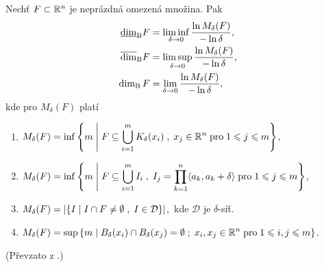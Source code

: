 \begin{theorem}\label{thm:ekvivalentni-def-box-counting-dimenze}
    Nechť $F\subset \mathbb{R}^n$ je neprázdná omezená množina. Pak
    \begin{align*}
        \underline{\dim}_\text{B}{F}&=\liminf_{\delta\to 0}\dfrac{\ln{M_\delta(F)}}{-\ln{\delta}},\\
        \overline{\dim}_\text{B}{F}&=\limsup_{\delta\to 0}\dfrac{\ln{M_\delta(F)}}{-\ln{\delta}},\\
        \operatorname{dim_B}{F}&=\lim_{\delta\to 0}\dfrac{\ln{M_\delta(F)}}{-\ln{\delta}},
    \end{align*}
    kde pro $M_\delta(F)$ platí
    \begin{enumerate}[label=(\roman*)]
        \item\label{thm:pokryti-delta-uz-koulemi} $\displaystyle M_\delta(F)=\inf\left\{m\;\middle|\;F\subseteq\bigcup\limits_{i=1}^m K_\delta(x_i)\;,\;x_j\in\mathbb{R}^n\;\text{pro}\;1\leqslant j\leqslant m\right\}$,
        \item\label{thm:pokryti-delta-kvadry} $\displaystyle M_\delta(F)=\inf\left\{m\;\middle|\;F\subseteq\bigcup\limits_{i=1}^m I_i\;,\;I_j=\prod_{k=1}^{n}\langle a_k,a_k+\delta\rangle\;\text{pro}\;1\leqslant j\leqslant m\right\}$,
        \item\label{thm:pokryti-delta-sit} $\displaystyle M_\delta(F)=\left|\left\{I\;\middle|\;I\cap F\neq\emptyset\;,\;I\in\mathcal{D}\right\}\right|$,~kde $\mathcal{D}$ je $\delta$-síť.
        \item\label{thm:pokryti-delta-dis-ot-koulemi} $\displaystyle M_\delta(F)=\sup\left\{m\;\middle|\;B_\delta(x_i)\cap B_\delta(x_j)=\emptyset\;;\;x_i,x_j\in\mathbb{R}^n\;\text{pro}\;1\leqslant i,j\leqslant m\right\}$.
    \end{enumerate}
\end{theorem}
(Převzato z \citep[str. 30]{Falconer2014}.)

